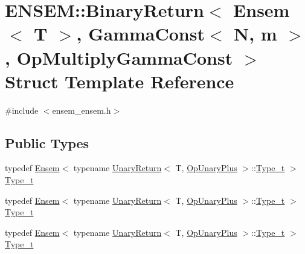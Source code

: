 \hypertarget{structENSEM_1_1BinaryReturn_3_01Ensem_3_01T_01_4_00_01GammaConst_3_01N_00_01m_01_4_00_01OpMultiplyGammaConst_01_4}{}\section{E\+N\+S\+EM\+:\+:Binary\+Return$<$ Ensem$<$ T $>$, Gamma\+Const$<$ N, m $>$, Op\+Multiply\+Gamma\+Const $>$ Struct Template Reference}
\label{structENSEM_1_1BinaryReturn_3_01Ensem_3_01T_01_4_00_01GammaConst_3_01N_00_01m_01_4_00_01OpMultiplyGammaConst_01_4}


{\ttfamily \#include $<$ensem\+\_\+ensem.\+h$>$}

\subsection*{Public Types}
\begin{DoxyCompactItemize}
\item 
typedef \mbox{\hyperlink{classENSEM_1_1Ensem}{Ensem}}$<$ typename \mbox{\hyperlink{structENSEM_1_1UnaryReturn}{Unary\+Return}}$<$ T, \mbox{\hyperlink{structENSEM_1_1OpUnaryPlus}{Op\+Unary\+Plus}} $>$\+::\mbox{\hyperlink{structENSEM_1_1BinaryReturn_3_01Ensem_3_01T_01_4_00_01GammaConst_3_01N_00_01m_01_4_00_01OpMultiplyGammaConst_01_4_a1e55c80ef6e9dca68a09e4de3cc64da6}{Type\+\_\+t}} $>$ \mbox{\hyperlink{structENSEM_1_1BinaryReturn_3_01Ensem_3_01T_01_4_00_01GammaConst_3_01N_00_01m_01_4_00_01OpMultiplyGammaConst_01_4_a1e55c80ef6e9dca68a09e4de3cc64da6}{Type\+\_\+t}}
\item 
typedef \mbox{\hyperlink{classENSEM_1_1Ensem}{Ensem}}$<$ typename \mbox{\hyperlink{structENSEM_1_1UnaryReturn}{Unary\+Return}}$<$ T, \mbox{\hyperlink{structENSEM_1_1OpUnaryPlus}{Op\+Unary\+Plus}} $>$\+::\mbox{\hyperlink{structENSEM_1_1BinaryReturn_3_01Ensem_3_01T_01_4_00_01GammaConst_3_01N_00_01m_01_4_00_01OpMultiplyGammaConst_01_4_a1e55c80ef6e9dca68a09e4de3cc64da6}{Type\+\_\+t}} $>$ \mbox{\hyperlink{structENSEM_1_1BinaryReturn_3_01Ensem_3_01T_01_4_00_01GammaConst_3_01N_00_01m_01_4_00_01OpMultiplyGammaConst_01_4_a1e55c80ef6e9dca68a09e4de3cc64da6}{Type\+\_\+t}}
\item 
typedef \mbox{\hyperlink{classENSEM_1_1Ensem}{Ensem}}$<$ typename \mbox{\hyperlink{structENSEM_1_1UnaryReturn}{Unary\+Return}}$<$ T, \mbox{\hyperlink{structENSEM_1_1OpUnaryPlus}{Op\+Unary\+Plus}} $>$\+::\mbox{\hyperlink{structENSEM_1_1BinaryReturn_3_01Ensem_3_01T_01_4_00_01GammaConst_3_01N_00_01m_01_4_00_01OpMultiplyGammaConst_01_4_a1e55c80ef6e9dca68a09e4de3cc64da6}{Type\+\_\+t}} $>$ \mbox{\hyperlink{structENSEM_1_1BinaryReturn_3_01Ensem_3_01T_01_4_00_01GammaConst_3_01N_00_01m_01_4_00_01OpMultiplyGammaConst_01_4_a1e55c80ef6e9dca68a09e4de3cc64da6}{Type\+\_\+t}}
\end{DoxyCompactItemize}


